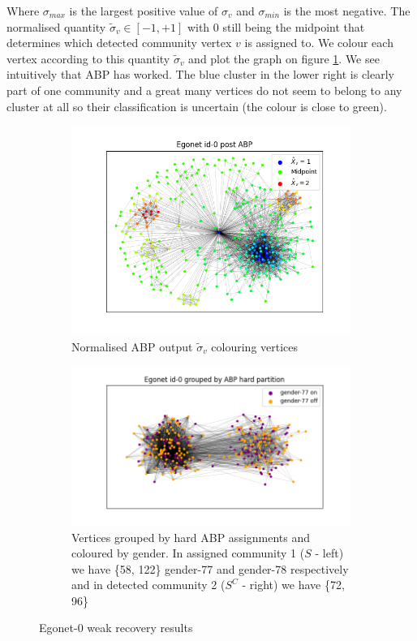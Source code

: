 \documentclass[]{article}
\begin{document}
Where $\sigma_{max}$ is the largest positive value of $\sigma_v$ and $\sigma_{min}$ is the most negative. The normalised quantity $\tilde{\sigma}_v \in [-1, +1]$ with $0$ still being the midpoint that determines which detected community vertex $v$ is assigned to. We colour each vertex according to this quantity $\tilde{\sigma}_v$ and plot the graph on figure \ref{fig:abp-output-norm}. We see intuitively that ABP has worked. The blue cluster in the lower right is clearly part of one community and a great many vertices do not seem to belong to any cluster at all so their classification is uncertain (the colour is close to green).
%
\begin{figure}[!h]
	\centering
	\begin{subfigure}{0.4\linewidth}
		\includegraphics[width=\linewidth]{ego-0-abp.png}
		\caption{Normalised ABP output $\tilde{\sigma}_v$ colouring vertices}
		\label{fig:abp-output-norm}
	\end{subfigure}
	\begin{subfigure}{0.4\linewidth}
		\includegraphics[width=\linewidth]{ego-0-abp-by-gender.png}
		\caption{Vertices grouped by hard ABP assignments and coloured by gender. In assigned community 1 ($S$ - left) we have \{58, 122\} gender-77 and gender-78 respectively and in detected community 2 ($S^C$ - right) we have \{72, 96\}}
		\label{fig:abp-output-by-gender}
	\end{subfigure}
	\caption{Egonet-0 weak recovery results}
\end{figure}
\end{document}
